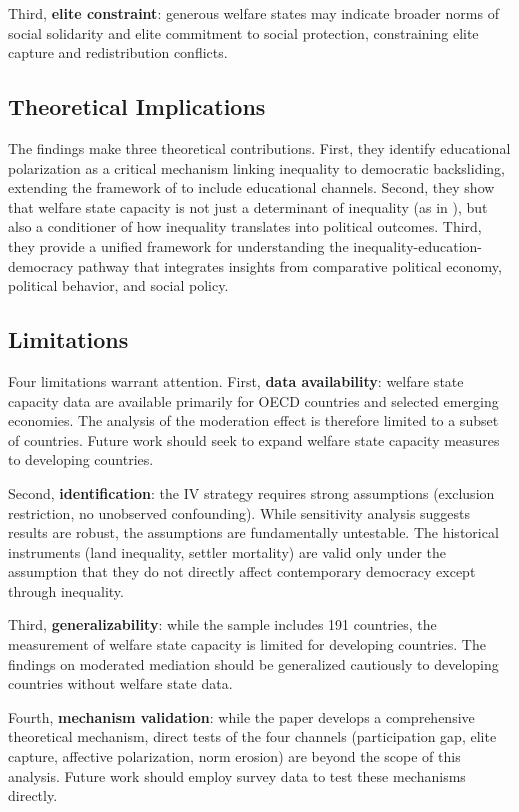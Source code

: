 \documentclass[11pt,letterpaper]{article}
\begin{document}
Third, \textbf{elite constraint}: generous welfare states may indicate broader norms of social solidarity and elite commitment to social protection, constraining elite capture and redistribution conflicts.

\subsection{Theoretical Implications}

The findings make three theoretical contributions. First, they identify educational polarization as a critical mechanism linking inequality to democratic backsliding, extending the framework of \cite{Acemoglu2006} to include educational channels. Second, they show that welfare state capacity is not just a determinant of inequality (as in \cite{Korpi1998}), but also a conditioner of how inequality translates into political outcomes. Third, they provide a unified framework for understanding the inequality-education-democracy pathway that integrates insights from comparative political economy, political behavior, and social policy.

\subsection{Limitations}

Four limitations warrant attention. First, \textbf{data availability}: welfare state capacity data are available primarily for OECD countries and selected emerging economies. The analysis of the moderation effect is therefore limited to a subset of countries. Future work should seek to expand welfare state capacity measures to developing countries.

Second, \textbf{identification}: the IV strategy requires strong assumptions (exclusion restriction, no unobserved confounding). While sensitivity analysis suggests results are robust, the assumptions are fundamentally untestable. The historical instruments (land inequality, settler mortality) are valid only under the assumption that they do not directly affect contemporary democracy except through inequality.

Third, \textbf{generalizability}: while the sample includes 191 countries, the measurement of welfare state capacity is limited for developing countries. The findings on moderated mediation should be generalized cautiously to developing countries without welfare state data.

Fourth, \textbf{mechanism validation}: while the paper develops a comprehensive theoretical mechanism, direct tests of the four channels (participation gap, elite capture, affective polarization, norm erosion) are beyond the scope of this analysis. Future work should employ survey data to test these mechanisms directly.
\end{document}
